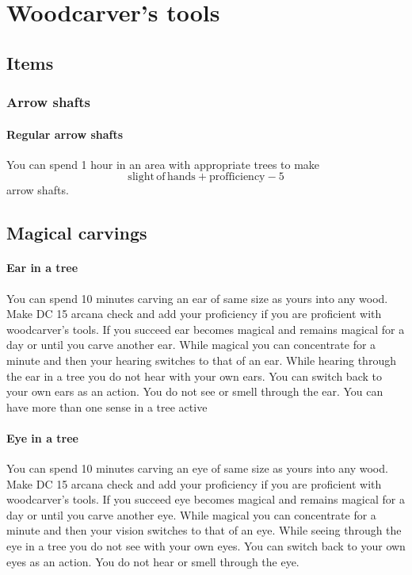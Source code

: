 \chapter{Woodcarver's tools}

\section{Items}

\subsection{Arrow shafts}

\subsubsection{Regular arrow shafts}

You can spend 1 hour in an area with appropriate trees to make $$\mathrm{slight\,of\,hands} + \mathrm{profficiency} - 5$$ arrow shafts.

\section{Magical carvings}

\subsubsection{Ear in a tree}

You can spend 10 minutes carving an ear of same size as yours into any wood. Make DC 15 arcana check and add your proficiency if you are proficient with woodcarver's tools. If you succeed ear becomes magical and remains magical for a day or until you carve another ear. While magical you can concentrate for a minute and then your hearing switches to that of an ear. While hearing through the ear in a tree you do not hear with your own ears. You can switch back to your own ears as an action. You do not see or smell through the ear. You can have more than one sense in a tree active

\subsubsection{Eye in a tree}

You can spend 10 minutes carving an eye of same size as yours into any wood. Make DC 15 arcana check and add your proficiency if you are proficient with woodcarver's tools. If you succeed eye becomes magical and remains magical for a day or until you carve another eye. While magical you can concentrate for a minute and then your vision switches to that of an eye. While seeing through the eye in a tree you do not see with your own eyes. You can switch back to your own eyes as an action. You do not hear or smell through the eye.

